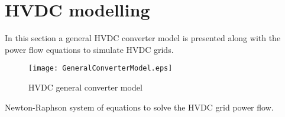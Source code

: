 \documentclass[11pt,fleqn]{book} %
\begin{document}

\pagestyle{empty} %

\renewcommand\contentsname{Table of content}
\tableofcontents%


\pagestyle{fancy} %



\chapter{HVDC modelling}

In this section a general HVDC converter model is presented along with the power flow equations to simulate HVDC grids.

\begin{figure}[h]
	\centering
	\texttt{[image: GeneralConverterModel.eps]}
	\caption{HVDC general converter model}
	\label{fig:GeneralHVDCConverterModel}
\end{figure}

Newton-Raphson system of equations to solve the HVDC grid power flow.
\end{document}
